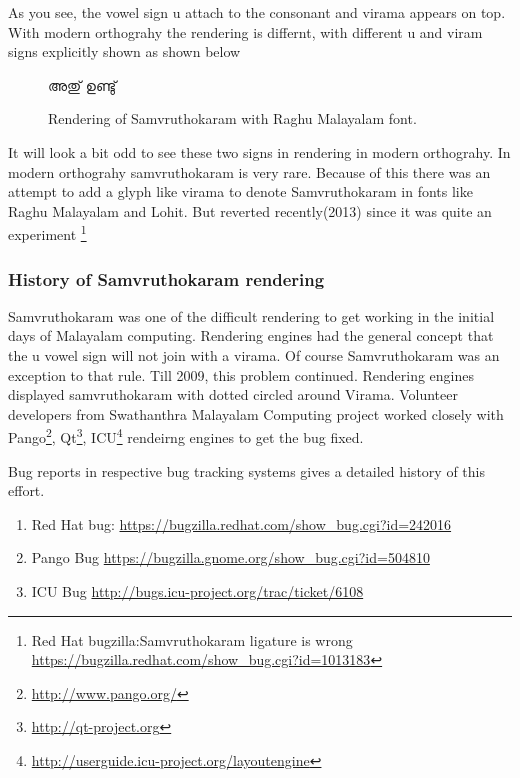 As you see, the vowel sign u attach to the consonant and virama appears on top.
With modern orthograhy the rendering is differnt, with different u and viram 
signs explicitly shown as shown below

\begin{figure}[h]
  \centering
  {\raghumalayalam\textexample  അതു് ഉണ്ടു് }\\
  \caption{Rendering of Samvruthokaram with Raghu Malayalam font.}
\end{figure}

It will look a bit odd to see these two signs in rendering in modern 
orthograhy. In modern orthograhy samvruthokaram is very rare. 
Because of this there was an attempt to add a glyph like virama to denote 
Samvruthokaram in fonts like Raghu Malayalam and Lohit.
But reverted recently(2013) since it was quite an experiment
\footnote{Red Hat bugzilla:Samvruthokaram ligature is wrong 
\url{https://bugzilla.redhat.com/show_bug.cgi?id=1013183}}

\subsubsection{History of Samvruthokaram rendering}

Samvruthokaram was one of the difficult rendering to get working in the initial 
days of Malayalam computing.
Rendering engines had the general concept that the u vowel sign will not join 
with a virama. Of course Samvruthokaram was an exception to that rule.
Till 2009, this problem continued. Rendering engines displayed samvruthokaram 
with dotted circled around Virama. 
Volunteer developers from Swathanthra Malayalam Computing project worked 
closely with Pango\footnote{\url{http://www.pango.org/}}, 
Qt\footnote{\url{http://qt-project.org}}, 
ICU\footnote{\url{http://userguide.icu-project.org/layoutengine}} rendeirng 
engines to get the bug fixed.

Bug reports in respective bug tracking systems gives a detailed history of this 
effort.

\begin{enumerate}
  \item Red Hat bug: \url{https://bugzilla.redhat.com/show_bug.cgi?id=242016}
  \item Pango Bug \url{https://bugzilla.gnome.org/show_bug.cgi?id=504810}
  \item ICU Bug \url{http://bugs.icu-project.org/trac/ticket/6108}
\end{enumerate}

